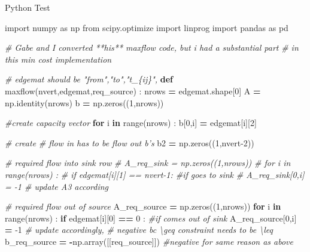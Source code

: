 \documentclass[
  ignorenonframetext,
]{beamer}
\newenvironment{Shaded}{\begin{snugshade}}{\end{snugshade}}
\newcommand{\BuiltInTok}[1]{#1}
\newcommand{\CommentTok}[1]{\textcolor[rgb]{0.56,0.35,0.01}{\textit{#1}}}
\newcommand{\ControlFlowTok}[1]{\textcolor[rgb]{0.13,0.29,0.53}{\textbf{#1}}}
\newcommand{\DecValTok}[1]{\textcolor[rgb]{0.00,0.00,0.81}{#1}}
\newcommand{\ImportTok}[1]{#1}
\newcommand{\KeywordTok}[1]{\textcolor[rgb]{0.13,0.29,0.53}{\textbf{#1}}}
\newcommand{\NormalTok}[1]{#1}
\newcommand{\OperatorTok}[1]{\textcolor[rgb]{0.81,0.36,0.00}{\textbf{#1}}}
\begin{document}
\begin{frame}[fragile]{Python Test}
\protect\hypertarget{python-test}{}

\begin{Shaded}
\begin{Highlighting}[]

\ImportTok{import}\NormalTok{ numpy }\ImportTok{as}\NormalTok{ np}
\ImportTok{from}\NormalTok{ scipy.optimize }\ImportTok{import}\NormalTok{ linprog}
\ImportTok{import}\NormalTok{ pandas }\ImportTok{as}\NormalTok{ pd}

\CommentTok{# Gabe and I converted **his** maxflow code, but i had a substantial part}
\CommentTok{# in this min cost implementation}

\CommentTok{# edgemat should be "from","to","t_\{ij\}",}
\KeywordTok{def}\NormalTok{ maxflow(nvert,edgemat,req_source) :}
\NormalTok{  nrows }\OperatorTok{=}\NormalTok{ edgemat.shape[}\DecValTok{0}\NormalTok{]}
\NormalTok{  A }\OperatorTok{=}\NormalTok{ np.identity(nrows)}
\NormalTok{  b }\OperatorTok{=}\NormalTok{ np.zeros((}\DecValTok{1}\NormalTok{,nrows))}
  
  \CommentTok{#create capacity vector}
  \ControlFlowTok{for}\NormalTok{ i }\KeywordTok{in} \BuiltInTok{range}\NormalTok{(nrows) :}
\NormalTok{    b[}\DecValTok{0}\NormalTok{,i] }\OperatorTok{=}\NormalTok{ edgemat[i][}\DecValTok{2}\NormalTok{]}
  
  \CommentTok{# create }
  \CommentTok{# flow in has to be flow out b's}
\NormalTok{  b2 }\OperatorTok{=}\NormalTok{ np.zeros((}\DecValTok{1}\NormalTok{,nvert}\DecValTok{-2}\NormalTok{)) }
  
  \CommentTok{# required flow into sink row}
  \CommentTok{# A_req_sink = np.zeros((1,nrows))}
  \CommentTok{# for i in range(nrows) :}
  \CommentTok{#   if edgemat[i][1] == nvert-1: #if goes to sink}
  \CommentTok{#     A_req_sink[0,i] = -1 # update A3 according}
      
  \CommentTok{# required flow out of source}
\NormalTok{  A_req_source }\OperatorTok{=}\NormalTok{ np.zeros((}\DecValTok{1}\NormalTok{,nrows))}
  \ControlFlowTok{for}\NormalTok{ i }\KeywordTok{in} \BuiltInTok{range}\NormalTok{(nrows) :}
    \ControlFlowTok{if}\NormalTok{ edgemat[i][}\DecValTok{0}\NormalTok{] }\OperatorTok{==} \DecValTok{0}\NormalTok{ : }\CommentTok{#if comes out of sink}
\NormalTok{      A_req_source[}\DecValTok{0}\NormalTok{,i] }\OperatorTok{=} \DecValTok{-1} \CommentTok{# update accordingly, }
        \CommentTok{# negative bc \textbackslash{}geq constraint needs to be \textbackslash{}leq}
\NormalTok{  b_req_source }\OperatorTok{=} \OperatorTok{-}\NormalTok{np.array([[req_source]]) }\CommentTok{#negative for same reason as above}
  

\end{Highlighting}
\end{Shaded}
\end{frame}
\end{document}
